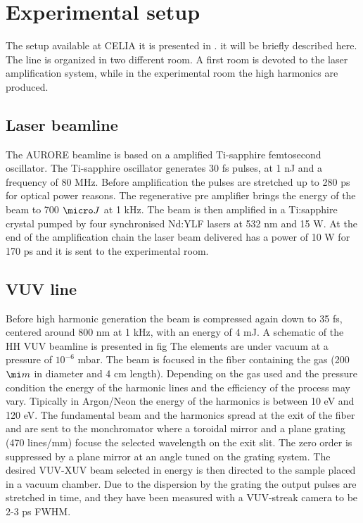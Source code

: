\section{Experimental setup}
The setup available at CELIA it is presented in \cite{Martin2001}. it will be briefly described here. The line is organized in two different room. A first room is devoted to the laser amplification system, while in the experimental room the high harmonics are produced.
\subsection{Laser beamline}
The AURORE beamline is based on a amplified Ti-sapphire femtosecond oscillator. 
The Ti-sapphire oscillator generates 30 fs pulses, at 1 nJ and a frequency of 80 MHz. Before amplification the pulses are stretched up to 280 ps for optical power reasons.
The regenerative pre amplifier brings the energy of the beam to 700 $\micro J$ at 1 kHz.
The beam is then amplified in a Ti:sapphire crystal pumped by four synchronised Nd:YLF lasers at 532 nm and 15 W.
At the end of the amplification chain the laser beam delivered has a power of 10 W for 170 ps and it is sent to the experimental room.
\subsection{VUV line}
Before high harmonic generation the beam is compressed again down to 35 fs, centered around 800 nm at 1 kHz, with an energy of 4 mJ.
A schematic of the HH VUV beamline is presented in fig
The elements are under vacuum at a pressure of $10^{-6}$ mbar. The beam is focused in the fiber containing the gas (200$\mi m$ in diameter and 4 cm length). Depending on the gas used and the pressure condition the energy of the harmonic lines and the efficiency of the process may vary. Tipically in Argon/Neon the energy of the harmonics is between 10 eV and 120 eV.
The fundamental beam and the harmonics spread at the exit of the fiber and are sent to the monchromator where a toroidal mirror and a plane grating (470 lines/mm) focuse the selected wavelength on the exit slit.
The zero order is suppressed by a plane mirror at an angle tuned on the grating system.
The desired VUV-XUV beam selected in energy is then directed to the sample placed in a vacuum chamber. Due to the dispersion by the grating the output pulses are stretched in time, and they have been measured with a VUV-streak camera to be 2-3 ps FWHM.
